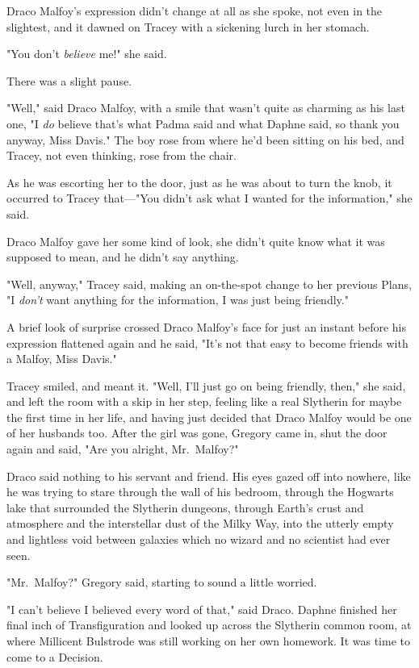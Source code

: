 Draco Malfoy's expression didn't change at all as she spoke, not even in the
slightest, and it dawned on Tracey with a sickening lurch in her stomach.

"You don't \emph{believe} me!" she said.

There was a slight pause.

"Well," said Draco Malfoy, with a smile that wasn't quite as charming as his
last one, "I \emph{do} believe that's what Padma said and what Daphne said, so
thank you anyway, Miss Davis." The boy rose from where he'd been sitting on his
bed, and Tracey, not even thinking, rose from the chair.

As he was escorting her to the door, just as he was about to turn the knob, it
occurred to Tracey that\mbox{---}"You didn't ask what I wanted for the information,"
she said.

Draco Malfoy gave her some kind of look, she didn't quite know what it was
supposed to mean, and he didn't say anything.

"Well, anyway," Tracey said, making an on-the-spot change to her previous
Plans, "I \emph{don't} want anything for the information, I was just being
friendly."

A brief look of surprise crossed Draco Malfoy's face for just an instant before
his expression flattened again and he said, "It's not that easy to become
friends with a Malfoy, Miss Davis."

Tracey smiled, and meant it. "Well, I'll just go on being friendly, then," she
said, and left the room with a skip in her step, feeling like a real Slytherin
for maybe the first time in her life, and having just decided that Draco Malfoy
would be one of her husbands too.
\sbreak
After the girl was gone, Gregory came in, shut the door again and said, "Are
you alright, Mr.~Malfoy?"

Draco said nothing to his servant and friend. His eyes gazed off into nowhere,
like he was trying to stare through the wall of his bedroom, through the
Hogwarts lake that surrounded the Slytherin dungeons, through Earth's crust and
atmosphere and the interstellar dust of the Milky Way, into the utterly empty
and lightless void between galaxies which no wizard and no scientist had ever
seen.

"Mr.~Malfoy?" Gregory said, starting to sound a little worried.

"I can't believe I believed every word of that," said Draco.
\sbreak
Daphne finished her final inch of Transfiguration and looked up across the
Slytherin common room, at where Millicent Bulstrode was still working on her
own homework. It was time to come to a Decision.

